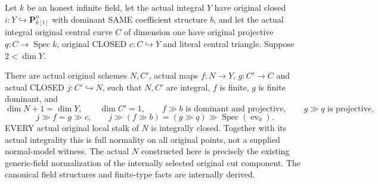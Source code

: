\begin{theorem}
\label{thm:pl-gauss-original-normalized-horizontal-stage}
\leanok
Let $k$ be an honest infinite field, let the actual integral $Y$
have original closed $i:Y\hookrightarrow\mathbf P^n_{k[t]}$ with
dominant SAME coefficient structure $b$, and let the actual integral
original central curve $C$ of dimension one have original projective
$q:C\to\operatorname{Spec}k$, original CLOSED $c:C\hookrightarrow Y$
and literal central triangle. Suppose $2<\dim Y$.

There are actual original schemes $N,C'$, actual maps
$f:N\to Y$, $g:C'\to C$ and actual CLOSED $j:C'\hookrightarrow N$,
such that $N,C'$ are integral, $f$ is finite, $g$ is finite dominant,
and
\[
 \dim N+1=\dim Y,\qquad \dim C'=1,\qquad
 f\gg b\text{ is dominant and projective},\qquad
 g\gg q\text{ is projective},
\]
\[
 j\gg f=g\gg c,\qquad
 j\gg(f\gg b)=(g\gg q)\gg\operatorname{Spec}(\operatorname{ev}_0).
\]
EVERY actual original local stalk of $N$ is integrally closed. Together
with its actual integrality this is full normality on all original
points, not a supplied normal-model witness. The actual $N$ constructed
here is precisely the existing generic-field normalization of the
internally selected original cut component. The canonical field
structures and finite-type facts are internally derived.
\end{theorem}
